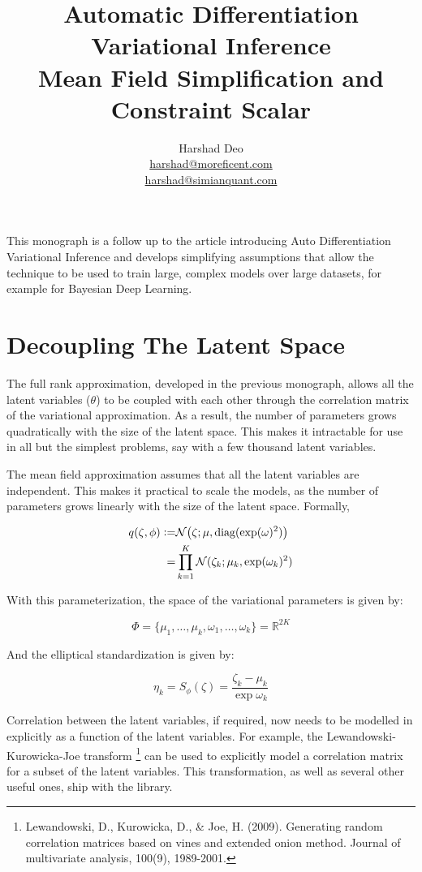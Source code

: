 \documentclass[10pt]{article}
\title{Automatic Differentiation Variational Inference \\ Mean Field Simplification and Constraint Scalar}
\author{Harshad Deo \\ 
  \href{mailto:harshad@moreficent.com}{harshad@moreficent.com} \\ 
  \href{mailto:harshad@simianquant.com}{harshad@simianquant.com}
}
\date{}
\newcommand{\defeq}{\vcentcolon=}
\begin{document}
  
\maketitle

This monograph is a follow up to the article introducing Auto Differentiation Variational Inference and develops simplifying
assumptions that allow the technique to be used to train large, complex models over large datasets, for example for Bayesian 
Deep Learning.

\section*{Decoupling The Latent Space}

The full rank approximation, developed in the previous monograph, allows all the latent variables ($\theta$) to be coupled
with each other through the correlation matrix of the variational approximation. As a result, the number of parameters
grows quadratically with the size of the latent space. This makes it intractable for 
use in all but the simplest problems, say with a few thousand latent variables. 

The mean field approximation assumes that all the latent variables are independent. This makes it practical to scale the 
models, as the number of parameters grows linearly with the size of the latent space. Formally,

\begin{align*}
  q(\zeta, \phi) \defeq& \mathcal{N}\big(\zeta; \mu, \text{diag}(\exp(\omega) ^2)\big) \\
  =& \prod_{k=1}^K \mathcal{N}(\zeta_k; \mu_k, \exp(\omega_k)^2)
\end{align*}

With this parameterization, the space of the variational parameters is given by:

\begin{equation*}
  \Phi = \{\mu_1, \ldots, \mu_k, \omega_1, \ldots, \omega_k\} = \mathbb{R}^{2K}
\end{equation*}

And the elliptical standardization is given by:

\begin{equation*}
  \eta_k = S_{\phi}(\zeta) = \frac{\zeta_k - \mu_k}{\exp \omega_k}
\end{equation*}

Correlation between the latent variables, if required, now needs to be modelled in explicitly as a function of the 
latent variables. For example, the Lewandowski-Kurowicka-Joe transform \footnote{Lewandowski, D., Kurowicka, D., \& Joe, H. (2009). Generating random correlation matrices based on vines and extended onion method. Journal of multivariate analysis, 100(9), 1989-2001.} 
can be used to explicitly model a correlation matrix for a subset of the latent variables. This transformation, as well as several 
other useful ones, ship with the library. 
\end{document}
